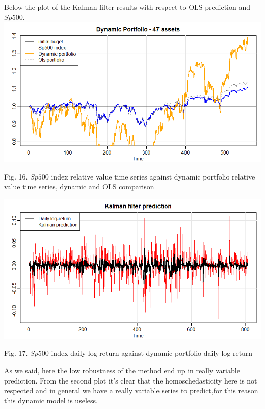 \documentclass{article}%
\begin{document}
Below the plot of the Kalman filter results with respect to OLS prediction and $Sp500$.
\\

\includegraphics[scale=0.55]{dynamic47}
\begin{center}
\begin{small}
Fig. 16. $Sp500$ index relative value time series against dynamic portfolio relative value time series, dynamic and OLS comparison
\\

\end{small}
\end{center}


  
\includegraphics[scale=0.55]{kalmanprediction}
\begin{center}
\begin{small}
Fig. 17. $Sp500$ index daily log-return against dynamic portfolio daily log-return
\\

\end{small}
\end{center}
       

As we said, here the low robustness of the method end up in really variable prediction. From the second plot it's clear that the homoschedasticity here is not respected and in general we have a really variable series to predict,for this reason this dynamic model is useless.
\end{document}
